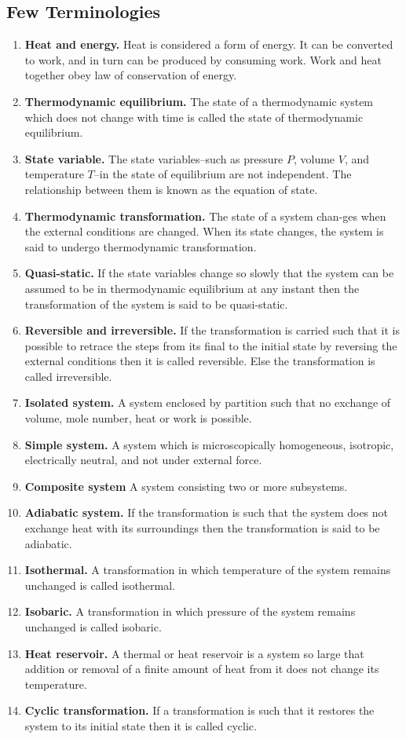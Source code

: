 \documentclass[../../../Main.tex]{subfiles}
\begin{document}
\subsection{Few Terminologies}
\begin{enumerate}
    \item \textbf{Heat and energy.} Heat is considered a form of energy. It can be converted to work, and in turn can be produced by consuming work. Work and heat together obey law of conservation of energy.
    \item \textbf{Thermodynamic equilibrium.} The state of a thermodynamic system which does not change with time is called the state of thermodynamic equilibrium.
    \item \textbf{State variable.} The state variables--such as pressure $P$, volume $V$, and temperature $T$--in the state of equilibrium are not independent. The relationship between them is known as the equation of state.
    \item \textbf{Thermodynamic transformation.} The state of a system chan-ges when the external conditions are changed. When its state changes, the system is said to undergo thermodynamic transformation.
    \item \textbf{Quasi-static.} If the state variables change so slowly that the system can be assumed to be in thermodynamic equilibrium at any instant then the transformation of the system is said to be quasi-static.
    \item \textbf{Reversible and irreversible.} If the transformation is carried such that it is possible to retrace the steps from its final to the initial state by reversing the external conditions then it is called reversible. Else the transformation is called irreversible.
    \item \textbf{Isolated system.} A system enclosed by partition such that no exchange of volume, mole number, heat or work is possible.
    \item \textbf{Simple system.} A system which is microscopically homogeneous, isotropic, electrically neutral, and not under external force.
    \item \textbf{Composite system} A system consisting two or more subsystems.
    \item \textbf{Adiabatic system.} If the transformation is such that the system does not exchange heat with its surroundings then the transformation is said to be adiabatic.
    \item \textbf{Isothermal.} A transformation in which temperature of the system remains unchanged is called isothermal.
    \item \textbf{Isobaric.} A transformation in which pressure of the system remains unchanged is called
    isobaric.
    \item \textbf{Heat reservoir.} A thermal or heat reservoir is a system so large that addition or removal of a finite amount of heat from it does not change its temperature.
    \item \textbf{Cyclic transformation.} If a transformation is such that it restores the system to its initial state then it is called cyclic. 
\end{enumerate}
\end{document}
